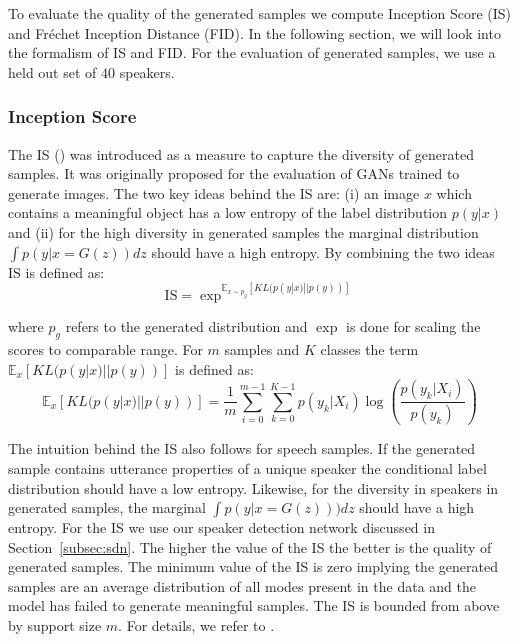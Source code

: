 To evaluate the quality of the generated samples we compute Inception Score (IS) and Fr\'{e}chet Inception Distance (FID). In the following section, we will look into the formalism of IS and FID. For the evaluation of generated samples, we use a held out set of $40$ speakers. 

\subsubsection{Inception Score}
\label{subsec:inception_score}
The IS (\cite{salimans2016improved}) was introduced as a measure to capture the diversity of generated samples. It was originally proposed for the evaluation of GANs trained to generate images. The two key ideas behind the IS are: (i) an image $x$ which contains a meaningful object has a low entropy of the label distribution $p(y|x)$ and (ii) for the high diversity in generated samples the marginal distribution $\int p(y|x=G(z)) dz$ should have a high entropy. By combining the two ideas IS is defined as:
\begin{equation}
    \text{IS} = \exp^{\mathbb{E}_{x\sim p_g} [KL (p(y|x)||p(y))]}
\end{equation}


where $p_g$ refers to the generated distribution and $\exp$ is done for scaling the scores to comparable range. For $m$ samples and $K$ classes the term $\mathbb{E}_x [KL (p(y|x)||p(y))]$ is defined as:
\begin{equation}
    \mathbb{E}_x [KL (p(y|x)||p(y))] = \frac{1}{m}\sum_{i=0}^{m-1}\sum_{k=0}^{K-1}p(y_k|X_i)\log(\frac{p(y_k|X_i)}{p(y_k)})
\end{equation}

 
The intuition behind the IS also follows for speech samples. If the generated sample contains utterance properties of a unique speaker the conditional label distribution should have a low entropy. Likewise, for the diversity in speakers in generated samples, the marginal $\int p(y|x=G(z))) dz$ should have a high entropy.
For the IS we use our speaker detection network discussed in Section~\ref{subsec:sdn}. The higher the value of the IS the better is the quality of generated samples. The minimum value of the IS is zero implying the generated samples are an average distribution of all modes present in the data and the model has failed to generate meaningful samples. The IS is bounded from above by support size $m$. For details, we refer to \citet{heusel2017gans}.

